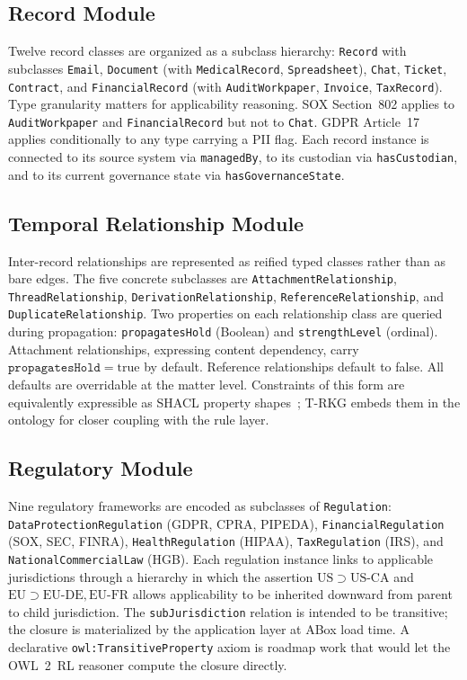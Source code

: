 \documentclass{ieeeaccess}
\begin{document}
\subsection{Record Module}

Twelve record classes are organized as a subclass hierarchy: \texttt{Record} with subclasses \texttt{Email}, \texttt{Document} (with \texttt{MedicalRecord}, \texttt{Spreadsheet}), \texttt{Chat}, \texttt{Ticket}, \texttt{Contract}, and \texttt{FinancialRecord} (with \texttt{AuditWorkpaper}, \texttt{Invoice}, \texttt{TaxRecord}). Type granularity matters for applicability reasoning. SOX Section~802 applies to \texttt{AuditWorkpaper} and \texttt{FinancialRecord} but not to \texttt{Chat}. GDPR Article~17 applies conditionally to any type carrying a PII flag. Each record instance is connected to its source system via \texttt{managedBy}, to its custodian via \texttt{hasCustodian}, and to its current governance state via \texttt{hasGovernanceState}.

\subsection{Temporal Relationship Module}

Inter-record relationships are represented as reified typed classes rather than as bare edges. The five concrete subclasses are \texttt{AttachmentRelationship}, \texttt{ThreadRelationship}, \texttt{DerivationRelationship}, \texttt{ReferenceRelationship}, and \texttt{DuplicateRelationship}. Two properties on each relationship class are queried during propagation: \texttt{propagatesHold} (Boolean) and \texttt{strengthLevel} (ordinal). Attachment relationships, expressing content dependency, carry $\texttt{propagatesHold} = \mathrm{true}$ by default. Reference relationships default to false. All defaults are overridable at the matter level. Constraints of this form are equivalently expressible as SHACL property shapes~\cite{shacl}; T-RKG embeds them in the ontology for closer coupling with the rule layer.

\subsection{Regulatory Module}

Nine regulatory frameworks are encoded as subclasses of \texttt{Regulation}: \texttt{DataProtectionRegulation} (GDPR, CPRA, PIPEDA), \texttt{FinancialRegulation} (SOX, SEC, FINRA), \texttt{HealthRegulation} (HIPAA), \texttt{TaxRegulation} (IRS), and \texttt{NationalCommercialLaw} (HGB). Each regulation instance links to applicable jurisdictions through a hierarchy in which the assertion $\mathrm{US} \supset \mathrm{US\text{-}CA}$ and $\mathrm{EU} \supset \mathrm{EU\text{-}DE}, \mathrm{EU\text{-}FR}$ allows applicability to be inherited downward from parent to child jurisdiction. The \texttt{subJurisdiction} relation is intended to be transitive; the closure is materialized by the application layer at ABox load time. A declarative \texttt{owl:TransitiveProperty} axiom is roadmap work that would let the OWL~2~RL reasoner compute the closure directly.
\end{document}
